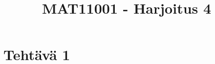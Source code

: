 \documentclass{article}
\begin{document}
	
	\title{MAT11001 - Harjoitus 4}
	\date{}
	\maketitle
	
	
	\section*{Tehtävä 1}
\end{document}
